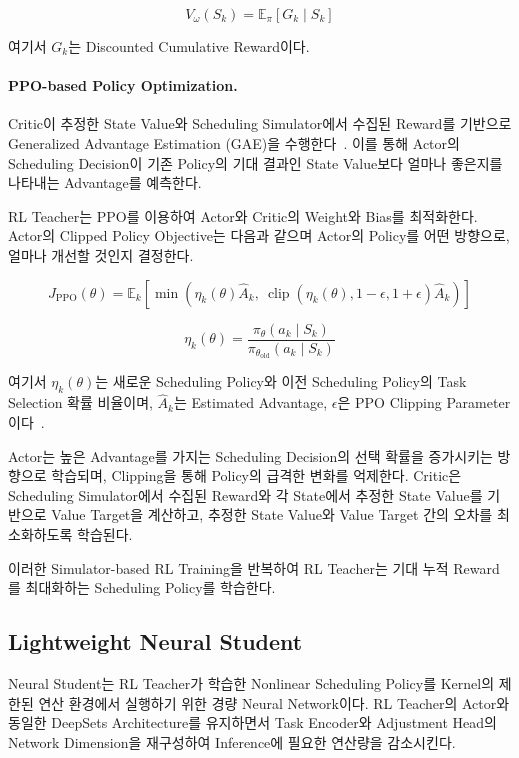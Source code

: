 \begin{equation}
    V_{\omega}(S_k) = \mathbb{E}_{\pi}[G_k\mid S_k]
\end{equation}

여기서 $G_k$는 Discounted Cumulative Reward이다.

\paragraph{PPO-based Policy Optimization.}
Critic이 추정한 State Value와 Scheduling Simulator에서
수집된 Reward를 기반으로 Generalized Advantage
Estimation (GAE)을 수행한다~\cite{gae}.
이를 통해 Actor의 Scheduling Decision이
기존 Policy의 기대 결과인 State Value보다 얼마나 좋은지를 나타내는
Advantage를 예측한다.

RL Teacher는 PPO를
이용하여 Actor와 Critic의 Weight와 Bias를
최적화한다.
Actor의 Clipped Policy Objective는 다음과 같으며 
Actor의 Policy를 어떤 방향으로, 얼마나 개선할 것인지 결정한다.

\begin{equation}
    J_{\mathrm{PPO}}(\theta) = \mathbb{E}_k\left[\min\left(\eta_k(\theta)\widehat{A}_k,\ \operatorname{clip}(\eta_k(\theta),1-\epsilon,1+\epsilon)\widehat{A}_k\right)\right]
\end{equation}

\begin{equation}
    \eta_k(\theta) = \frac{\pi_{\theta}(a_k\mid S_k)}{\pi_{\theta_{\mathrm{old}}}(a_k\mid S_k)}
\end{equation}

여기서 $\eta_k(\theta)$는 새로운 Scheduling Policy와 이전 Scheduling Policy의
Task Selection 확률 비율이며, $\widehat{A}_k$는 Estimated Advantage,
$\epsilon$은 PPO Clipping Parameter이다~\cite{ppo}.

Actor는 높은 Advantage를 가지는 Scheduling Decision의
선택 확률을 증가시키는 방향으로 학습되며,
Clipping을 통해 Policy의 급격한 변화를 억제한다.
Critic은 Scheduling Simulator에서 수집된 Reward와
각 State에서 추정한 State Value를 기반으로
Value Target을 계산하고, 추정한 State Value와
Value Target 간의 오차를 최소화하도록 학습된다.

이러한 Simulator-based RL Training을 반복하여 RL Teacher는
기대 누적 Reward를 최대화하는 Scheduling Policy를
학습한다.

\subsection{Lightweight Neural Student}
\label{sec:design-lightweight-neural-student}
Neural Student는 RL Teacher가 학습한 Nonlinear
Scheduling Policy를 Kernel의 제한된 연산 환경에서
실행하기 위한 경량 Neural Network이다.
RL Teacher의 Actor와 동일한 DeepSets Architecture를
유지하면서 Task Encoder와 Adjustment Head의
Network Dimension을 재구성하여 Inference에
필요한 연산량을 감소시킨다.


